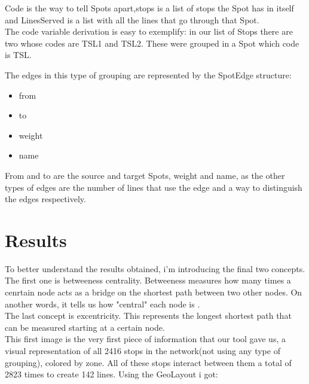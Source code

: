 \documentclass[12pt]{article}
\begin{document}
\begin{multicols}{2}
Code is the way to tell Spots apart,stops is a list of stops the Spot has in itself and LinesServed is a list with all the lines that go through that Spot.\\
The code variable derivation is easy to exemplify: in our list of Stops there are two whose codes are TSL1 and TSL2. These were grouped in a Spot which code is TSL.

The edges in this type of grouping are represented by the SpotEdge structure:
\begin{itemize}
\item from
\item to
\item weight
\item name
\end{itemize}

From and to are the source and target Spots, weight and name, as the other types of edges are the number of lines that use the edge and a way to distinguish the edges respectively.
	
\section{Results}
	To better understand the results obtained, i'm introducing the final two concepts.
	The first one is betweeness centrality. Betweeness measures how many times a cenrtain node acts as a bridge on the shortest path between two other nodes. On another words, it tells us how "central" each node is \cite{freeman1977set}.\\
	The last concept is excentricity. This represents the longest shortest path that can be measured starting at a certain node\cite{Hage199557}.\\
	This first image is the very first piece of information that our tool gave us, a visual representation of all 2416 stops in the network(not using any type of grouping), colored by zone. All of these stops interact between them a total of 2823 times to create 142 lines. Using the GeoLayout i got:\\


\end{multicols}
\end{document}

